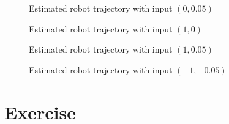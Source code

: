 \documentclass[conference]{IEEEtran}
\begin{document}
\begin{compactenum}[a)]
\begin{figure}[h!]
    \scalebox{.6}{}
    \caption{Estimated robot trajectory with input $(0,0.05)$}
    \label{fig:robotLR1}
\end{figure}
\begin{figure}[h!]
  	\centering
    \scalebox{.6}{}
    \caption{Estimated robot trajectory with input $(1,0)$}
    \label{fig:robotLR2}
\end{figure}
\begin{figure}[h!]
  	\centering
    \scalebox{.6}{}
    \caption{Estimated robot trajectory with input $(1,0.05)$}
    \label{fig:robotLR3}
\end{figure}
\begin{figure}[h!]
  	\centering
    \scalebox{.6}{}
    \caption{Estimated robot trajectory with input $(-1,-0.05)$}
    \label{fig:robotLR4}
\end{figure}
\end{compactenum}

\section{Exercise}
\end{document}
